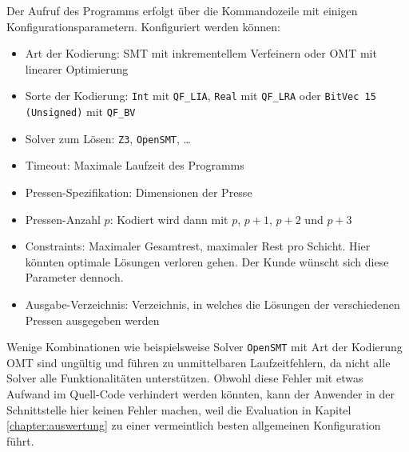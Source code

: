 Der Aufruf des Programms erfolgt über die Kommandozeile mit einigen Konfigurationsparametern.
Konfiguriert werden können:

\begin{itemize}
    \item Art der Kodierung: SMT mit inkrementellem Verfeinern oder OMT mit linearer Optimierung
    \item Sorte der Kodierung: \texttt{Int} mit \texttt{QF\_LIA}, \texttt{Real} mit \texttt{QF\_LRA} oder \texttt{BitVec 15 (Unsigned)} mit \texttt{QF\_BV}
    \item Solver zum Lösen: \texttt{Z3}, \texttt{OpenSMT}, \ldots
    \item Timeout: Maximale Laufzeit des Programms
    \item Pressen-Spezifikation: Dimensionen der Presse
    \item Pressen-Anzahl $p$: Kodiert wird dann mit $p$, $p+1$, $p+2$ und $p+3$
    \item Constraints: Maximaler Gesamtrest, maximaler Rest pro Schicht. Hier könnten optimale Lösungen verloren gehen. Der Kunde wünscht sich diese Parameter dennoch.
    \item Ausgabe-Verzeichnis: Verzeichnis, in welches die Lösungen der verschiedenen Pressen ausgegeben werden
\end{itemize}

Wenige Kombinationen wie beispielsweise Solver \texttt{OpenSMT} mit Art der Kodierung OMT sind ungültig und führen zu unmittelbaren Laufzeitfehlern,
da nicht alle Solver alle Funktionalitäten unterstützen.
Obwohl diese Fehler mit etwas Aufwand im Quell-Code verhindert werden könnten, kann der Anwender in der Schnittstelle hier keinen Fehler machen, weil
die Evaluation in Kapitel \ref{chapter:auswertung} zu einer vermeintlich besten allgemeinen Konfiguration führt.